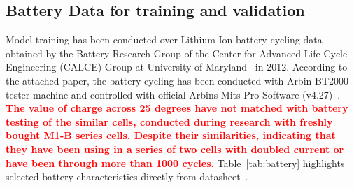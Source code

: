 \subsection{Battery Data for training and validation} \label{subsec:b_data}
Model training has been conducted over Lithium-Ion battery cycling data obtained by the Battery Research Group of the Center for Advanced Life
Cycle Engineering (CALCE) Group at University of Maryland~\cite{noauthor_calce_2017} in 2012.
According to the attached paper, the battery cycling has been conducted with Arbin BT2000 tester machine and controlled with official Arbins Mits Pro Software (v4.27)~\cite{xing_state_2014}.
\textcolor{red}{\textbf{The value of charge across 25 degrees have not matched with battery testing of the similar cells, conducted during research with freshly bought M1-B series cells.
Despite their similarities, indicating that they have been using in a series of two cells with doubled current or have been through more than 1000 cycles.}}
\mbox{Table~\ref{tab:battery}} highlights selected battery characteristics directly from datasheet~\cite{noauthor_anr26650m1a}.
\begin{table}[ht]
    \renewcommand{\arraystretch}{1.3}
    \caption{Battery characteristics}
    \centering
    \label{tab:battery}
\end{table}

